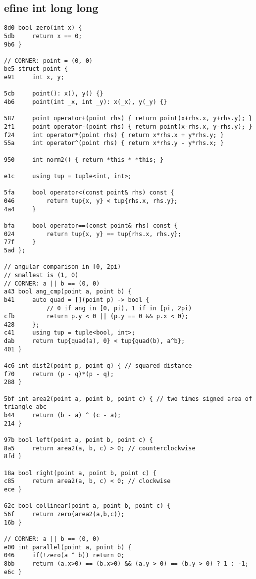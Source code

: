 \documentclass[11pt, a4paper, twoside]{article}
\begin{document}
\subsection{efine int long long}
\begin{lstlisting}
8d0 bool zero(int x) {
5db 	return x == 0;
9b6 }

// CORNER: point = (0, 0)
be5 struct point {
e91 	int x, y;
    	
5cb 	point(): x(), y() {}
4b6 	point(int _x, int _y): x(_x), y(_y) {}
    	
587 	point operator+(point rhs) { return point(x+rhs.x, y+rhs.y); }
2f1 	point operator-(point rhs) { return point(x-rhs.x, y-rhs.y); }
f24 	int operator*(point rhs) { return x*rhs.x + y*rhs.y; }
55a 	int operator^(point rhs) { return x*rhs.y - y*rhs.x; }
    
950 	int norm2() { return *this * *this; }
    
e1c 	using tup = tuple<int, int>;
    
5fa 	bool operator<(const point& rhs) const {
046 		return tup{x, y} < tup{rhs.x, rhs.y};
4a4 	}
    	
bfa 	bool operator==(const point& rhs) const {
024 		return tup{x, y} == tup{rhs.x, rhs.y};
77f 	}
5ad };

// angular comparison in [0, 2pi)
// smallest is (1, 0)
// CORNER: a || b == (0, 0)
a43 bool ang_cmp(point a, point b) {
b41 	auto quad = [](point p) -> bool {
    		// 0 if ang in [0, pi), 1 if in [pi, 2pi)
cfb 		return p.y < 0 || (p.y == 0 && p.x < 0);
428 	};
c41 	using tup = tuple<bool, int>;
dab 	return tup{quad(a), 0} < tup{quad(b), a^b};
401 }

4c6 int dist2(point p, point q) { // squared distance
f70     return (p - q)*(p - q);
288 }

5bf int area2(point a, point b, point c) { // two times signed area of triangle abc
b44 	return (b - a) ^ (c - a);
214 }

97b bool left(point a, point b, point c) {
8a5 	return area2(a, b, c) > 0; // counterclockwise
8fd }

18a bool right(point a, point b, point c) {
c85 	return area2(a, b, c) < 0; // clockwise
ece }

62c bool collinear(point a, point b, point c) {
56f 	return zero(area2(a,b,c));
16b }

// CORNER: a || b == (0, 0)
e00 int parallel(point a, point b) {
046 	if(!zero(a ^ b)) return 0;
8bb 	return (a.x>0) == (b.x>0) && (a.y > 0) == (b.y > 0) ? 1 : -1;
e6c }


\end{lstlisting}
\end{document}
